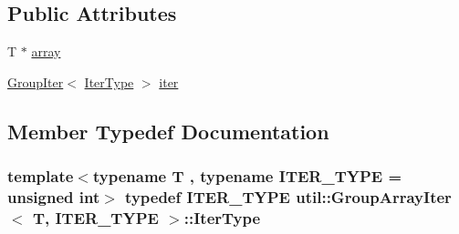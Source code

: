 \subsection*{Public Attributes}
\begin{DoxyCompactItemize}
\item 
T $\ast$ \hyperlink{structutil_1_1GroupArrayIter_adf4e06f1ee63dc9c6c2532e183eb9e81}{array}
\item 
\hyperlink{structutil_1_1GroupIter}{Group\-Iter}$<$ \hyperlink{structutil_1_1GroupArrayIter_ad105aaa84576beb16fc721a13dfbd7d9}{Iter\-Type} $>$ \hyperlink{structutil_1_1GroupArrayIter_af1a5c6d6428cd51e501f506231f3e203}{iter}
\end{DoxyCompactItemize}


\subsection{Member Typedef Documentation}
\hypertarget{structutil_1_1GroupArrayIter_ad105aaa84576beb16fc721a13dfbd7d9}{
\subsubsection[{Iter\-Type}]{\setlength{\rightskip}{0pt plus 5cm}template$<$typename T , typename I\-T\-E\-R\-\_\-\-T\-Y\-P\-E  = unsigned int$>$ typedef I\-T\-E\-R\-\_\-\-T\-Y\-P\-E {\bf util\-::\-Group\-Array\-Iter}$<$ T, I\-T\-E\-R\-\_\-\-T\-Y\-P\-E $>$\-::{\bf Iter\-Type}}}\label{structutil_1_1GroupArrayIter_ad105aaa84576beb16fc721a13dfbd7d9}



